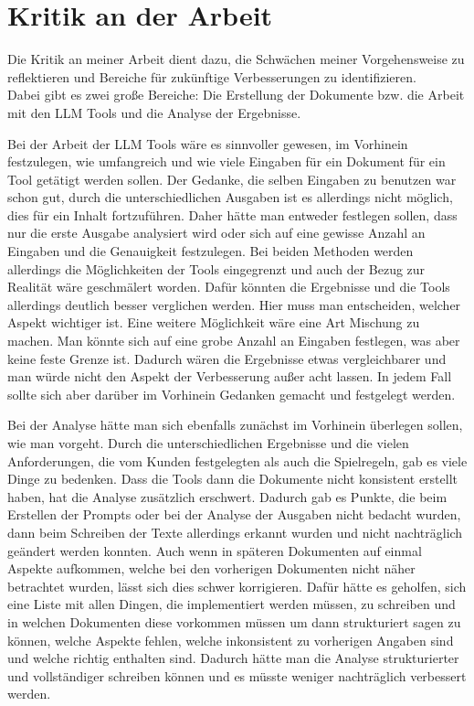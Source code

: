 \section{Kritik an der Arbeit}  \label{Kritik an der Arbeit}

Die Kritik an meiner Arbeit dient dazu, die Schwächen meiner Vorgehensweise zu reflektieren und Bereiche für zukünftige 
Verbesserungen zu identifizieren.\\
Dabei gibt es zwei große Bereiche: Die Erstellung der Dokumente bzw. die Arbeit mit den LLM Tools und die Analyse der 
Ergebnisse.

Bei der Arbeit der LLM Tools wäre es sinnvoller gewesen, im Vorhinein festzulegen, wie umfangreich und wie viele Eingaben 
für ein Dokument für ein Tool getätigt werden sollen. Der Gedanke, die selben Eingaben zu benutzen war schon gut, durch 
die unterschiedlichen Ausgaben ist es allerdings nicht möglich, dies für ein Inhalt fortzuführen. Daher hätte man 
entweder festlegen sollen, dass nur die erste Ausgabe analysiert wird oder sich auf eine gewisse Anzahl an Eingaben 
und die Genauigkeit festzulegen. Bei beiden Methoden werden allerdings die Möglichkeiten der Tools eingegrenzt und auch der 
Bezug zur Realität wäre geschmälert worden. Dafür könnten die Ergebnisse und die Tools allerdings deutlich besser verglichen werden.
Hier muss man entscheiden, welcher Aspekt wichtiger ist. Eine weitere Möglichkeit wäre eine Art Mischung zu machen. 
Man könnte sich auf eine grobe Anzahl an Eingaben festlegen, was aber keine feste Grenze ist. Dadurch wären die Ergebnisse 
etwas vergleichbarer und man würde nicht den Aspekt der Verbesserung außer acht lassen. In jedem Fall sollte sich aber darüber 
im Vorhinein Gedanken gemacht und festgelegt werden. 

Bei der Analyse hätte man sich ebenfalls zunächst im Vorhinein überlegen sollen, wie man vorgeht. Durch die unterschiedlichen
Ergebnisse und die vielen Anforderungen, die vom Kunden festgelegten als auch die Spielregeln, gab es viele Dinge zu bedenken.
Dass die Tools dann die Dokumente nicht konsistent erstellt haben, hat die Analyse zusätzlich erschwert. Dadurch gab es Punkte, die 
beim Erstellen der Prompts oder bei der Analyse der Ausgaben nicht bedacht wurden, dann beim Schreiben der Texte allerdings erkannt wurden
und nicht nachträglich geändert werden konnten. Auch wenn in späteren Dokumenten auf einmal Aspekte aufkommen, welche bei den 
vorherigen Dokumenten nicht näher betrachtet wurden, lässt sich dies schwer korrigieren. Dafür hätte es geholfen, sich eine 
Liste mit allen Dingen, die implementiert werden müssen, zu schreiben und in welchen Dokumenten diese vorkommen müssen um dann 
strukturiert sagen zu können, welche Aspekte fehlen, welche inkonsistent zu vorherigen Angaben sind und welche richtig enthalten 
sind. Dadurch hätte man die Analyse strukturierter und vollständiger schreiben können und es müsste weniger nachträglich verbessert werden.

